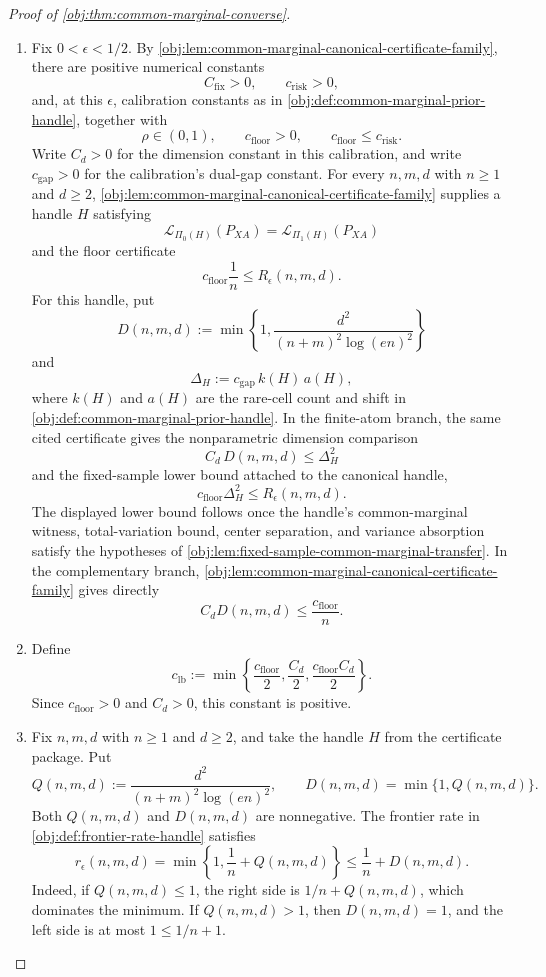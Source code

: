 \documentclass[11pt]{article}
\begin{document}
\begin{proof}[Proof of \cref{obj:thm:common-marginal-converse}]
\begin{enumerate}
\item Fix \(0<\epsilon<1/2\).  By \cref{obj:lem:common-marginal-canonical-certificate-family}, there are positive numerical constants
\[
C_{\mathrm{fix}}>0,\qquad c_{\mathrm{risk}}>0,
\]
and, at this \(\epsilon\), calibration constants as in \cref{obj:def:common-marginal-prior-handle}, together with
\[
\rho\in(0,1),\qquad c_{\mathrm{floor}}>0,
\qquad c_{\mathrm{floor}}\le c_{\mathrm{risk}}.
\]
Write \(C_d>0\) for the dimension constant in this calibration, and write \(c_{\mathrm{gap}}>0\) for the calibration's dual-gap constant.  For every \(n,m,d\) with \(n\ge1\) and \(d\ge2\), \cref{obj:lem:common-marginal-canonical-certificate-family} supplies a handle \(H\) satisfying
\[
\mathcal L_{\Pi_0(H)}(P_{XA})
=
\mathcal L_{\Pi_1(H)}(P_{XA})
\]
and the floor certificate
\[
c_{\mathrm{floor}}\frac1n\le R_\epsilon(n,m,d).
\]
For this handle, put
\[
D(n,m,d):=
\min\left\{1,\frac{d^2}{(n+m)^2\log(en)^2}\right\}
\]
and
\[
\Delta_H:=c_{\mathrm{gap}}\,k(H)\,a(H),
\]
where \(k(H)\) and \(a(H)\) are the rare-cell count and shift in \cref{obj:def:common-marginal-prior-handle}.  In the finite-atom branch, the same cited certificate gives the nonparametric dimension comparison
\[
C_d\,D(n,m,d)\le \Delta_H^2
\]
and the fixed-sample lower bound attached to the canonical handle,
\[
c_{\mathrm{floor}}\Delta_H^2\le R_\epsilon(n,m,d).
\]
The displayed lower bound follows once the handle's common-marginal witness, total-variation bound, center separation, and variance absorption satisfy the hypotheses of \cref{obj:lem:fixed-sample-common-marginal-transfer}.
In the complementary branch, \cref{obj:lem:common-marginal-canonical-certificate-family} gives directly
\[
C_dD(n,m,d)\le \frac{c_{\mathrm{floor}}}{n}.
\] %

\item Define
\[
c_{\mathrm{lb}}:=
\min\left\{
\frac{c_{\mathrm{floor}}}{2},
\frac{C_d}{2},
\frac{c_{\mathrm{floor}}C_d}{2}
\right\}.
\]
Since \(c_{\mathrm{floor}}>0\) and \(C_d>0\), this constant is positive. %

\item Fix \(n,m,d\) with \(n\ge1\) and \(d\ge2\), and take the handle \(H\) from the certificate package.  Put
\[
Q(n,m,d):=
\frac{d^2}{(n+m)^2\log(en)^2},
\qquad
D(n,m,d)=\min\{1,Q(n,m,d)\}.
\]
Both \(Q(n,m,d)\) and \(D(n,m,d)\) are nonnegative.  The frontier rate in \cref{obj:def:frontier-rate-handle} satisfies
\[
r_\epsilon(n,m,d)
=
\min\left\{1,\frac1n+Q(n,m,d)\right\}
\le
\frac1n+D(n,m,d).
\]
Indeed, if \(Q(n,m,d)\le1\), the right side is \(1/n+Q(n,m,d)\), which dominates the minimum.  If \(Q(n,m,d)>1\), then \(D(n,m,d)=1\), and the left side is at most \(1\le 1/n+1\). %


\end{enumerate}
\end{proof}
\end{document}

